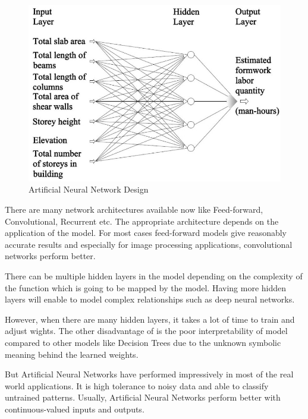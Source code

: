 \begin{itemize}
\begin{itemize}
                \begin{figure}[htbp]
                    \centering
	                \includegraphics[scale=0.3]{Figures/ann.jpeg}
                    \caption[Artificial Neural Network Design]{Artificial Neural Network Design}
	                \label{fig:Naive Bayes}
                \end{figure}
                
                There are many network architectures available now like Feed-forward, Convolutional, Recurrent etc. The appropriate architecture depends on the application of the model. For most cases feed-forward models give reasonably accurate results and especially for image processing applications, convolutional networks perform better.

                There can be multiple hidden layers in the model depending on the complexity of the function which is going to be mapped by the model. Having more hidden layers will enable to model complex relationships such as deep neural networks.

                However, when there are many hidden layers, it takes a lot of time to train and adjust wights. The other disadvantage of is the poor interpretability of model compared to other models like Decision Trees due to the unknown symbolic meaning behind the learned weights.

                But Artificial Neural Networks have performed impressively in most of the real world applications. It is high tolerance to noisy data and able to classify untrained patterns. Usually, Artificial Neural Networks perform better with continuous-valued inputs and outputs.


\end{itemize}
\end{itemize}
